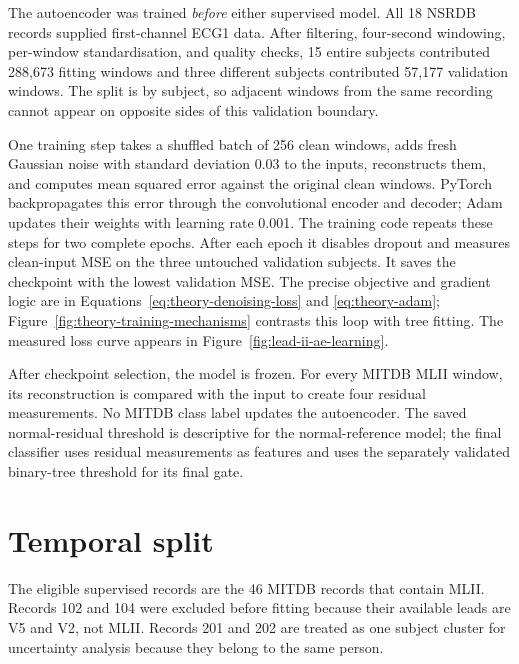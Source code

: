 The autoencoder was trained \emph{before} either supervised model. All 18
NSRDB records supplied first-channel ECG1 data. After filtering,
four-second windowing, per-window standardisation, and quality checks,
15 entire subjects contributed 288,673 fitting windows and three different
subjects contributed 57,177 validation windows. The split is by subject, so
adjacent windows from the same recording cannot appear on opposite sides of
this validation boundary.

One training step takes a shuffled batch of 256 clean windows, adds fresh
Gaussian noise with standard deviation 0.03 to the inputs, reconstructs them,
and computes mean squared error against the original clean windows. PyTorch
backpropagates this error through the convolutional encoder and decoder;
Adam updates their weights with learning rate 0.001. The training code repeats
these steps for two complete epochs. After each epoch it disables dropout and
measures clean-input MSE on the three untouched validation subjects. It saves
the checkpoint with the lowest validation MSE. The precise objective and
gradient logic are in Equations~\ref{eq:theory-denoising-loss} and
\ref{eq:theory-adam}; Figure~\ref{fig:theory-training-mechanisms} contrasts
this loop with tree fitting. The measured loss curve appears in
Figure~\ref{fig:lead-ii-ae-learning}.

After checkpoint selection, the model is frozen. For every MITDB MLII window,
its reconstruction is compared with the input to create four residual
measurements. No MITDB class label updates the autoencoder. The saved
normal-residual threshold is descriptive for the normal-reference model;
the final classifier uses residual measurements as features and uses the
separately validated binary-tree threshold for its final gate.

\section{Temporal split}

The eligible supervised records are the 46 MITDB records that contain MLII.
Records 102 and 104 were excluded before fitting because their available leads
are V5 and V2, not MLII. Records 201 and 202 are treated as one subject cluster
for uncertainty analysis because they belong to the same person.


